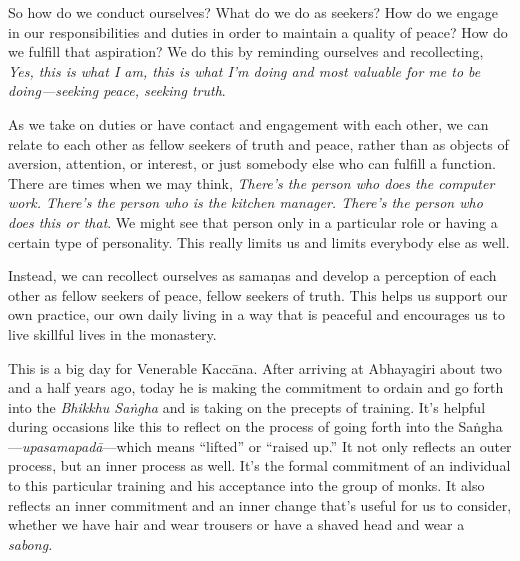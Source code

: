 So how do we conduct ourselves? What do we do as seekers? How do we 
engage in our responsibilities and duties in order to maintain a 
quality of peace? How do we fulfill that aspiration? We do this by 
reminding ourselves and recollecting, \emph{Yes, this is what I am, 
this is what I'm doing and most valuable for me to be doing---seeking 
peace, seeking truth}.

As we take on duties or have contact and engagement with each other, we 
can relate to each other as fellow seekers of truth and peace, rather 
than as objects of aversion, attention, or interest, or just somebody 
else who can fulfill a function. There are times when we may think, 
\emph{There's the person who does the computer work. There's the person 
who is the kitchen manager. There's the person who does this or that}. 
We might see that person only in a particular role or having a certain 
type of personality. This really limits us and limits everybody else as 
well.

Instead, we can recollect ourselves as samaṇas and develop a 
perception of each other as fellow seekers of peace, fellow seekers of 
truth. This helps us support our own practice, our own daily living in 
a way that is peaceful and encourages us to live skillful lives in the 
monastery.


This is a big day for Venerable Kaccāna. After arriving at Abhayagiri 
about two and a half years ago, today he is making the commitment to 
ordain and go forth into the \emph{Bhikkhu Saṅgha} and is taking on 
the precepts of training. It's helpful during occasions like this to 
reflect on the process of going forth into the 
Saṅgha---\emph{upasamapadā}---which means ``lifted'' or ``raised 
up.'' It not only reflects an outer process, but an inner process as 
well. It's the formal commitment of an individual to this particular 
training and his acceptance into the group of monks. It also reflects 
an inner commitment and an inner change that's useful for us to 
consider, whether we have hair and wear trousers or have a shaved head 
and wear a \emph{sabong.}

